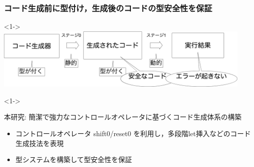 \begin{frame}
  \frametitle{コード生成前に型付け，生成後のコードの型安全性を保証}




  \begin{onlyenv}<1->
    \center
    \includegraphics[clip,height=3.0cm]{./img/prggen_type4.png}
  \end{onlyenv}

  \begin{uncoverenv}<1->
    \begin{block}{本研究: 簡潔で強力なコントロールオペレータに基づくコード生成体系の構築}
      \begin{itemize}
      \item コントロールオペレータ shift0/reset0 を利用し，多段階let挿入などのコード生成技法を表現
      \item 型システムを構築して型安全性を保証
      \end{itemize}
    \end{block}
  \end{uncoverenv}

\end{frame}


